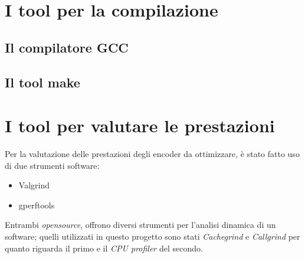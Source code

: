 
\section{I tool per la compilazione}


\subsection{Il compilatore GCC}


\subsection{Il tool make}


\section{I tool per valutare le prestazioni}
Per la valutazione delle prestazioni degli encoder da ottimizzare, è stato 
fatto uso di due strumenti software:
\begin{itemize}
\item Valgrind
\item gperftools
\end{itemize}
Entrambi \emph{opensource}, offrono diversi strumenti per l'analisi dinamica 
di un software; quelli utilizzati in questo progetto sono stati
\emph{Cachegrind} e \emph{Callgrind} per quanto riguarda il primo e il 
\emph{CPU profiler} del secondo.

